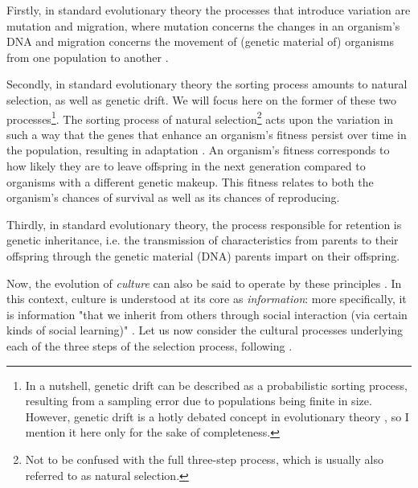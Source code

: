 Firstly, in standard evolutionary theory the processes that introduce variation are mutation and migration, where mutation concerns the changes in an organism's DNA and migration concerns the movement of (genetic material of) organisms from one population to another \citep{S-P13}.

Secondly, in standard evolutionary theory the sorting process amounts to natural selection, as well as genetic drift. We will focus here on the former of these two processes\footnote{In a nutshell, genetic drift can be described as a probabilistic sorting process, resulting from a sampling error due to populations being finite in size. However, genetic drift is a hotly debated concept in evolutionary theory \citep[see][for an overview]{Millstein21}, so I mention it here only for the sake of completeness.}.
The sorting process of natural selection\footnote{Not to be confused with the full three-step process, which is usually also referred to as natural selection.}
acts upon the variation in such a way that the genes that enhance an organism's fitness persist over time in the population, resulting in adaptation \citep{S-P13}. An organism's fitness corresponds to how likely they are to leave offspring in the next generation compared to organisms with a different genetic makeup. This fitness relates to both the organism's chances of survival as well as its chances of reproducing.

Thirdly, in standard evolutionary theory, the process responsible for retention is genetic inheritance, i.e. the transmission of characteristics from parents to their offspring through the genetic material (DNA) parents impart on their offspring.

Now, the evolution of \emph{culture} can also be said to operate by these principles \citep{Heyes18}. In this context, culture is understood at its core as \emph{information}: more specifically, it is information "that we inherit from others through social interaction (via certain kinds of social learning)" \citep[p.~30]{Heyes18}.
Let us now consider the cultural processes underlying each of the three steps of the selection process, following \citet[pp.~33--34]{Heyes18}.

